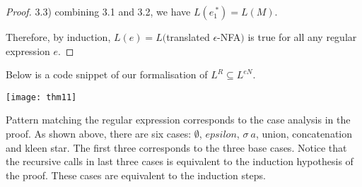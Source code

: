 \begin{proof}
\par 3.3) combining 3.1 and 3.2, we have \(L(e_1^{\ *}) = L(M)\). 

\par \noindent Therefore, by induction, \(L(e) = L(\)translated
\(\epsilon\)-NFA\()\) is true for all any regular expression \(e\). 
\end{proof}

\par Below is a code snippet of our formalisation of \(L^R \subseteq
L^{eN}\). 

\begin{center} \texttt{[image: thm11]} \end{center}

\par Pattern matching the regular expression corresponds to the case
analysis in the proof. As shown above, there are six cases:
\(\emptyset\), \(epsilon\), \(\sigma\ a\), union, concatenation and
kleen star. The first three corresponds to the three base
cases. Notice that the recursive calls in last three cases is equivalent to the induction hypothesis of the
proof. These cases are equivalent to the induction steps. 